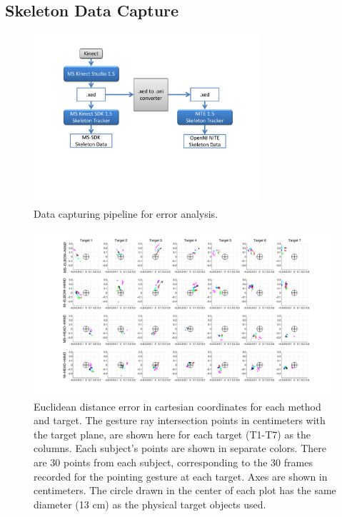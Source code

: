 \subsection{Skeleton Data Capture}
\label{sec:pointing_skeleton_data_capture}

\begin{figure}[ht!]
\centering
\includegraphics[width=0.75\textwidth]{pics/xedoni_2_cropped}
\caption{Data capturing pipeline for error analysis.}
\label{fig:xedoni}
\end{figure}

\begin{landscape}



\begin{figure}[ht!]
\centering
\includegraphics[width=1.5\textwidth]{pics/projections.pdf}
\caption{Euclidean distance error in cartesian coordinates for each method and target. The gesture ray intersection points in centimeters with the target plane, are shown here for each target (T1-T7) as the columns.  Each subject's points are shown in separate colors.  There are 30 points from each subject, corresponding to the 30 frames recorded for the pointing gesture at each target.  Axes are shown in centimeters.  The circle drawn in the center of each plot has the same diameter (13 cm) as the physical target objects used.}
\label{fig:euclidean_projections}
\end{figure}

\end{landscape}

